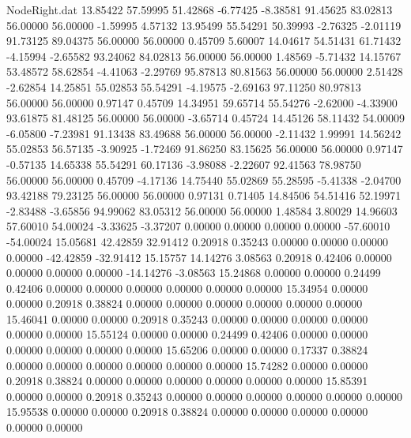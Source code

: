 \begin{filecontents}{NodeRight.dat}
  13.85422   57.59995   51.42868    -6.77425   -8.38581   91.45625   83.02813   56.00000   56.00000   -1.59995    4.57132
  13.95499   55.54291   50.39993    -2.76325   -2.01119   91.73125   89.04375   56.00000   56.00000    0.45709    5.60007
  14.04617   54.51431   61.71432    -4.15994   -2.65582   93.24062   84.02813   56.00000   56.00000    1.48569   -5.71432
  14.15767   53.48572   58.62854    -4.41063   -2.29769   95.87813   80.81563   56.00000   56.00000    2.51428   -2.62854
  14.25851   55.02853   55.54291    -4.19575   -2.69163   97.11250   80.97813   56.00000   56.00000    0.97147    0.45709
  14.34951   59.65714   55.54276    -2.62000   -4.33900   93.61875   81.48125   56.00000   56.00000   -3.65714    0.45724
  14.45126   58.11432   54.00009    -6.05800   -7.23981   91.13438   83.49688   56.00000   56.00000   -2.11432    1.99991
  14.56242   55.02853   56.57135    -3.90925   -1.72469   91.86250   83.15625   56.00000   56.00000    0.97147   -0.57135
  14.65338   55.54291   60.17136    -3.98088   -2.22607   92.41563   78.98750   56.00000   56.00000    0.45709   -4.17136
  14.75440   55.02869   55.28595    -5.41338   -2.04700   93.42188   79.23125   56.00000   56.00000    0.97131    0.71405
  14.84506   54.51416   52.19971    -2.83488   -3.65856   94.99062   83.05312   56.00000   56.00000    1.48584    3.80029
  14.96603   57.60010   54.00024    -3.33625   -3.37207    0.00000    0.00000    0.00000    0.00000  -57.60010  -54.00024
  15.05681   42.42859   32.91412     0.20918    0.35243    0.00000    0.00000    0.00000    0.00000  -42.42859  -32.91412
  15.15757   14.14276    3.08563     0.20918    0.42406    0.00000    0.00000    0.00000    0.00000  -14.14276   -3.08563
  15.24868    0.00000    0.00000     0.24499    0.42406    0.00000    0.00000    0.00000    0.00000    0.00000    0.00000
  15.34954    0.00000    0.00000     0.20918    0.38824    0.00000    0.00000    0.00000    0.00000    0.00000    0.00000
  15.46041    0.00000    0.00000     0.20918    0.35243    0.00000    0.00000    0.00000    0.00000    0.00000    0.00000
  15.55124    0.00000    0.00000     0.24499    0.42406    0.00000    0.00000    0.00000    0.00000    0.00000    0.00000
  15.65206    0.00000    0.00000     0.17337    0.38824    0.00000    0.00000    0.00000    0.00000    0.00000    0.00000
  15.74282    0.00000    0.00000     0.20918    0.38824    0.00000    0.00000    0.00000    0.00000    0.00000    0.00000
  15.85391    0.00000    0.00000     0.20918    0.35243    0.00000    0.00000    0.00000    0.00000    0.00000    0.00000
  15.95538    0.00000    0.00000     0.20918    0.38824    0.00000    0.00000    0.00000    0.00000    0.00000    0.00000

\end{filecontents}
